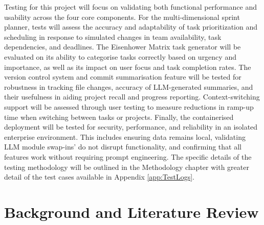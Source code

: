 \documentclass{report}
\begin{document}
Testing for this project will focus on validating both functional performance and usability across the four core components. For the multi-dimensional sprint planner, tests will assess the accuracy and adaptability of task prioritization and scheduling in response to simulated changes in team availability, task dependencies, and deadlines. The Eisenhower Matrix task generator will be evaluated on its ability to categorise tasks correctly based on urgency and importance, as well as its impact on user focus and task completion rates.
The version control system and commit summarisation feature will be tested for robustness in tracking file changes, accuracy of LLM-generated summaries, and their usefulness in aiding project recall and progress reporting. Context-switching support will be assessed through user testing to measure reductions in ramp-up time when switching between tasks or projects.
Finally, the containerised deployment will be tested for security, performance, and reliability in an isolated enterprise environment. This includes ensuring data remains local, validating LLM module swap-ins’ do not disrupt functionality, and confirming that all features work without requiring prompt engineering. The specific details of the testing methodology will be outlined in the Methodology chapter with greater detail of the test cases available in Appendix \ref{app:TestLogs}.

\chapter{Background and Literature Review}  %
\end{document}
